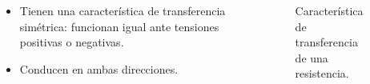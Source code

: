 \documentclass[10pt,t,aspectratio=169]{beamer}
\begin{document}
\begin{frame}[t]
\begin{columns}
\begin{column}[t]{0.7\textwidth}
    \vspace{3mm}
    \begin{itemize}
      \item Tienen una característica de transferencia simétrica: funcionan igual ante tensiones positivas o negativas.
      \item Conducen en ambas direcciones.
      \end{itemize}
  \end{column}
  \begin{column}[t]{0.3\textwidth}
    \begin{figure}[H]
      \centering
      \pgfplotsset{width=\textwidth,compat=1.9}
      \small{Característica de transferencia de una resistencia.}
      \end{figure}
    \end{column}
  \end{columns}
\end{frame}
\end{document}
